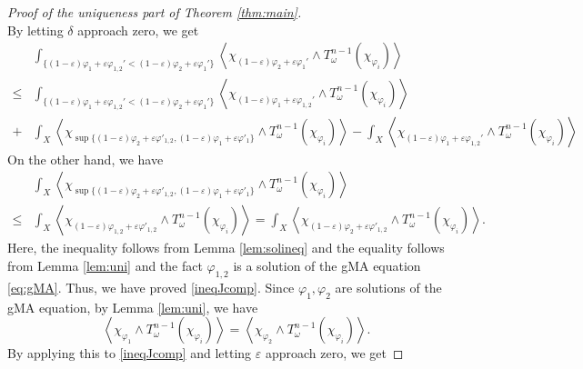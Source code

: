 \documentclass{amsart}
\numberwithin{equation}{section}
\theoremstyle{plain}
\theoremstyle{definition}
\theoremstyle{remark}
\begin{document}
\begin{proof}[Proof of the uniqueness part of Theorem \ref{thm:main}]
\begin{equation*}
    \end{equation*}
    By letting $\delta$ approach zero, we get
    \begin{equation*}
        \begin{split}
            &\int_{\{(1-\varepsilon)\varphi_1+\varepsilon\varphi_{1,2}'<(1-\varepsilon)\varphi_2+\varepsilon\varphi_1'\}}\left\langle\chi_{(1-\varepsilon)\varphi_2+\varepsilon\varphi_1'}\wedge T^{n-1}_\omega(\chi_{\varphi_i})\right\rangle\\
        \le &\int_{\{(1-\varepsilon)\varphi_1+\varepsilon\varphi_{1,2}'<(1-\varepsilon)\varphi_2+\varepsilon\varphi_1'\}}\left\langle\chi_{(1-\varepsilon)\varphi_1+\varepsilon\varphi_{1,2}'}\wedge T^{n-1}_\omega(\chi_{\varphi_i})\right\rangle\\
        +&\int_X \left\langle\chi_{\sup\{(1-\varepsilon)\varphi_2+\varepsilon\varphi'_{1,2},(1-\varepsilon)\varphi_1+\varepsilon\varphi'_1\}}\wedge T^{n-1}_\omega(\chi_{\varphi_i})\right\rangle
        -\int_X\left\langle\chi_{(1-\varepsilon)\varphi_1+\varepsilon\varphi_{1,2}'}\wedge T^{n-1}_\omega(\chi_{\varphi_i})\right\rangle
        \end{split}
    \end{equation*}
    On the other hand, we have
    \begin{equation*}
        \begin{split}
            &\int_X \left\langle\chi_{\sup\{(1-\varepsilon)\varphi_2+\varepsilon\varphi'_{1,2},(1-\varepsilon)\varphi_1+\varepsilon\varphi'_1\}}\wedge T^{n-1}_\omega(\chi_{\varphi_i})\right\rangle\\
            \le&\int_X \left\langle\chi_{(1-\varepsilon)\varphi_{1,2}+\varepsilon\varphi'_{1,2}}\wedge T^{n-1}_\omega(\chi_{\varphi_i})\right\rangle
            =\int_X \left\langle\chi_{(1-\varepsilon)\varphi_2+\varepsilon\varphi'_{1,2}}\wedge T^{n-1}_\omega(\chi_{\varphi_i})\right\rangle.
        \end{split}
    \end{equation*}
    Here, the inequality follows from Lemma \ref{lem:solineq} and the equality follows from Lemma \ref{lem:uni} and the fact $\varphi_{1,2}$ is a solution of the gMA equation \eqref{eq:gMA}. Thus, we have proved \eqref{ineqJcomp}. Since $\varphi_1,\varphi_2$ are solutions of the gMA equation, by Lemma \ref{lem:uni}, we have
    $$\left\langle\chi_{\varphi_1}\wedge T^{n-1}_\omega(\chi_{\varphi_i})\right\rangle=\left\langle\chi_{\varphi_2}\wedge  T^{n-1}_\omega(\chi_{\varphi_i})\right\rangle.$$
    By applying this to \eqref{ineqJcomp} and letting $\varepsilon$ approach zero, we get

\end{proof}
\end{document}
